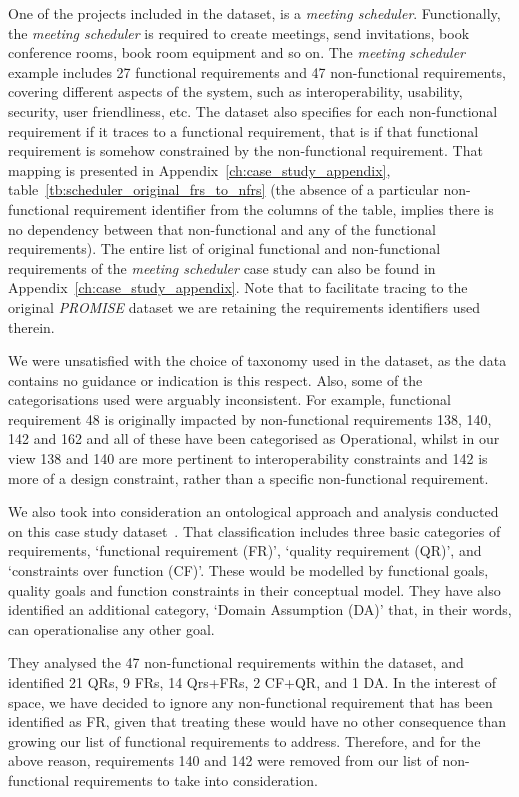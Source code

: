 \documentclass[dissertation,final]{softeng}
\newcommand{\nfrs}{non-functional requirements\xspace}
\begin{document}
One of the projects included in the dataset, is a \emph{meeting scheduler}. Functionally, the \emph{meeting scheduler} is required to create meetings, send invitations, book conference rooms, book room equipment and so on. The \emph{meeting scheduler} example includes 27 functional requirements and 47 \nfrs, covering different aspects of the system, such as interoperability, usability, security, user friendliness, etc. The dataset also specifies for each non-functional requirement if it traces to a functional requirement, that is if that functional requirement is somehow constrained by the non-functional requirement. That mapping is presented in Appendix~\ref{ch:case_study_appendix}, table~\ref{tb:scheduler_original_frs_to_nfrs} (the absence of a particular non-functional requirement identifier from the columns of the table, implies there is no dependency between that non-functional and any of the functional requirements). The entire list of original functional and non-functional requirements of the \emph{meeting scheduler} case study can also be found in Appendix~\ref{ch:case_study_appendix}. Note that to facilitate tracing to the original \emph{PROMISE} dataset we are retaining the requirements identifiers used therein.

We were unsatisfied with the choice of taxonomy used in the dataset, as the data contains no guidance or indication is this respect. Also, some of the categorisations used were arguably inconsistent. For example, functional requirement 48 is originally impacted by non-functional requirements 138, 140, 142 and 162 and all of these have been categorised as Operational, whilst in our view 138 and 140 are more pertinent to interoperability constraints and 142 is more of a design constraint, rather than a specific non-functional requirement.

We also took into consideration an ontological approach and analysis conducted on this case study dataset~\citep{MylopoulosOnt2014}. That classification includes three basic categories of requirements, `functional requirement (FR)', `quality requirement (QR)', and `constraints over function (CF)'. These would be modelled by functional goals, quality goals and function constraints in their conceptual model. They have also identified an additional category, `Domain Assumption (DA)' that, in their words, can operationalise any other goal.

They analysed the 47 \nfrs within the dataset, and identified 21 QRs, 9 FRs, 14 Qrs+FRs, 2 CF+QR, and 1 DA. In the interest of space, we have decided to ignore any non-functional requirement that has been identified as FR, given that treating these would have no other consequence than growing our list of functional requirements to address. Therefore, and for the above reason, requirements 140 and 142 were removed from our list of \nfrs to take into consideration.
\end{document}
